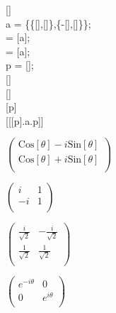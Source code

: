 \documentclass{article}
\begin{document}
[]\\
a = \{\{[\theta ],[\theta ]\},\{-[\theta ],[\theta ]\}\};\\
 = [a];\\
 = [a];\\
p =   [];\\
[]\\
[]\\
[p]\\
[[[p].a.p]]

\begin{doublespace}
\noindent\(\left(
\begin{array}{c}
 \text{Cos}[\theta ]-i \text{Sin}[\theta ] \\
 \text{Cos}[\theta ]+i \text{Sin}[\theta ] \\
\end{array}
\right)\)
\end{doublespace}

\begin{doublespace}
\noindent\(\left(
\begin{array}{cc}
 i & 1 \\
 -i & 1 \\
\end{array}
\right)\)
\end{doublespace}

\begin{doublespace}
\noindent\(\left(
\begin{array}{cc}
 \frac{i}{\sqrt{2}} & -\frac{i}{\sqrt{2}} \\
 \frac{1}{\sqrt{2}} & \frac{1}{\sqrt{2}} \\
\end{array}
\right)\)
\end{doublespace}

\begin{doublespace}
\noindent\(\left(
\begin{array}{cc}
 e^{-i \theta } & 0 \\
 0 & e^{i \theta } \\
\end{array}
\right)\)
\end{doublespace}
\end{document}
